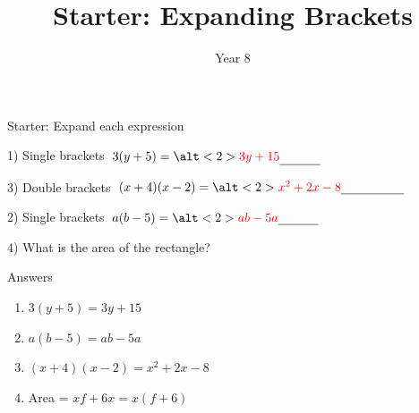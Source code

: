 \documentclass{beamer}
\title{Starter: Expanding Brackets}
\author{Year 8}
\date{}
\newcommand{\ablank}[1]{%
  \alt<2>{\textcolor{red}{#1}}{\underline{\phantom{#1}}}%
}
\newcommand{\ashow}[1]{\uncover<2->{\textcolor{red}{\small #1}}}
\newcommand{\ashowq}[1]{\alt<2->{\textcolor{red}{\small #1}}{?}}
\begin{document}
\begin{frame}
  \titlepage
\end{frame}

\begin{frame}{Starter: Expand each expression}
\begin{minipage}[t]{0.48\textwidth}
  \begin{block}{1) Single brackets}
    \Large \(\;3(y+5)=\ablank{3y+15}\)
  \end{block}
  \vspace{0.5em}
  \begin{block}{3) Double brackets}
    \Large \(\;(x+4)(x-2)=\ablank{x^2+2x-8}\)
  \end{block}
\end{minipage}\hfill
\begin{minipage}[t]{0.48\textwidth}
  \begin{block}{2) Single brackets}
    \Large \(\; a(b-5)=\ablank{ab-5a}\)
  \end{block}
  \vspace{0.5em}
  \begin{block}{4) What is the area of the rectangle?}
    \par\vspace{0.5em}
    \ashow{Area = \(x(f+6)\)}
  \end{block}
\end{minipage}
\end{frame}

\begin{frame}{Answers}
\begin{enumerate}
  \item \(3(y+5)=3y+15\)
  \item \(a(b-5)=ab-5a\)
  \item \((x+4)(x-2)=x^2+2x-8\)
  \item Area = \(xf + 6x = x(f+6)\)
\end{enumerate}
\end{frame}
\end{document}
